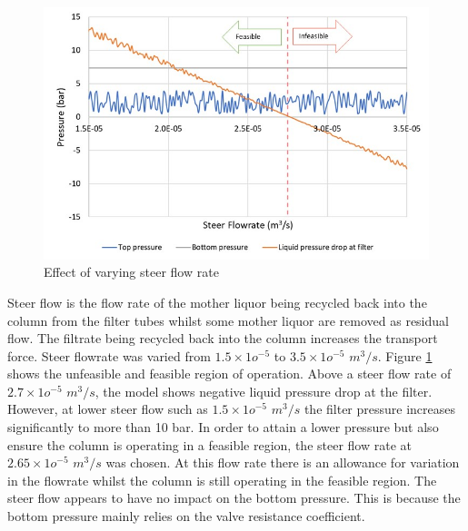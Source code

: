 \begin{figure}
\centering
\includegraphics[width=\linewidth]{chapters/3-separation/figures/steerflow.jpg}
\caption{Effect of varying steer flow rate}
\label{fig:steer_col}
\end{figure}

Steer flow is the flow rate of the mother liquor being recycled back into the column from the filter tubes whilst some mother liquor are removed as residual flow. The filtrate being recycled back into the column increases the transport force. Steer flowrate was varied from $1.5 \times 1o^{-5}$ to $3.5 \times 1o^{-5}$ $m^{3}/s$. Figure \ref{fig:steer_col} shows the unfeasible and feasible region of operation. Above a steer flow rate of $2.7 \times 1o^{-5}$ $m^{3}/s$, the model shows negative liquid pressure drop at the filter. However, at lower steer flow such as $1.5 \times 1o^{-5}$ $m^{3}/s$ the filter pressure increases significantly to more than 10 bar. In order to attain a lower pressure but also ensure the column is operating in a feasible region, the steer flow rate at $2.65 \times 1o^{-5}$ $m^{3}/s$ was chosen. At this flow rate there is an allowance for variation in the flowrate whilst the column is still operating in the feasible region. The steer flow appears to have no impact on the bottom pressure. This is because the bottom pressure mainly relies on the valve resistance coefficient. 


